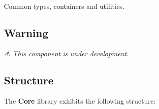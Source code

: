 Common types, containers and utilities.

\href{https://travis-ci.com/open-space-collective/open-space-toolkit-core}{\tt } \href{https://codecov.io/gh/open-space-collective/open-space-toolkit-core}{\tt } \href{https://open-space-collective.github.io/open-space-toolkit-core}{\tt } \href{https://badge.fury.io/gh/open-space-collective%2Fopen-space-toolkit-core}{\tt } \href{https://badge.fury.io/py/open-space-toolkit-core}{\tt } \href{https://opensource.org/licenses/Apache-2.0}{\tt }

\subsection*{Warning}

{\itshape ⚠ This component is under development.}

\subsection*{Structure}

The {\bfseries Core} library exhibits the following structure\+:


